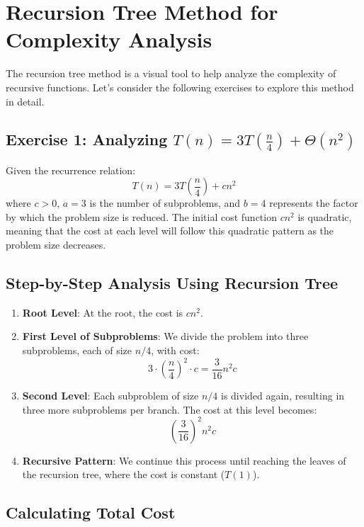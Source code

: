 \section{Recursion Tree Method for Complexity Analysis}

The recursion tree method is a visual tool to help analyze the complexity of recursive functions. Let’s consider the following exercises to explore this method in detail.

\subsection{Exercise 1: Analyzing \( T(n) = 3T\left(\frac{n}{4}\right) + \Theta(n^2) \)}
Given the recurrence relation:
\[
T(n) = 3T\left(\frac{n}{4}\right) + c n^2
\]
where \(c > 0\), \(a = 3\) is the number of subproblems, and \(b = 4\) represents the factor by which the problem size is reduced. The initial cost function \(cn^2\) is quadratic, meaning that the cost at each level will follow this quadratic pattern as the problem size decreases.

\subsection{Step-by-Step Analysis Using Recursion Tree}
\begin{enumerate}
    \item \textbf{Root Level}: At the root, the cost is \(cn^2\).

    \item \textbf{First Level of Subproblems}: We divide the problem into three subproblems, each of size \(n/4\), with cost:
   \[
   3 \cdot \left(\frac{n}{4}\right)^2 \cdot c = \frac{3}{16} n^2 c
   \]

    \item \textbf{Second Level}: Each subproblem of size \(n/4\) is divided again, resulting in three more subproblems per branch. The cost at this level becomes:
   \[
   \left(\frac{3}{16}\right)^2 n^2 c
   \]

    \item \textbf{Recursive Pattern}: We continue this process until reaching the leaves of the recursion tree, where the cost is constant (\(T(1)\)).
\end{enumerate}


\subsection{Calculating Total Cost}

